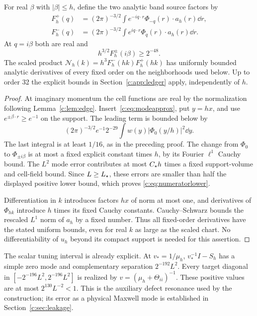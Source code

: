 \begin{lemma}
\label{c:lem:numerator}
For real $\beta$ with $|\beta|\le h$, define the two analytic band
source factors by
\begin{align*}
 F_h^+(q)&=(2\pi)^{-3/2}\int e^{-iq\cdot r}
             \Phi_{-q}(r)\cdot a_h(r)\dd r,\\
 F_h^-(q)&=(2\pi)^{-3/2}\int e^{iq\cdot r}
             \Phi_q(r)\cdot a_h(r)\dd r.
\end{align*}
At $q=i\beta$ both are real and
\begin{equation}
 h^{3/2}F_h^\pm(i\beta)\ge2^{-48}.                   \label{c:eq:numeratorlower}
\end{equation}
The scaled product
$\mathcal N_h(k)=h^3F_h^-(hk)F_h^+(hk)$ has uniformly bounded
analytic derivatives of every fixed order on the neighborhoods used
below. Up to order 32 the explicit bounds in
Section~\ref{c:app:ledger} apply, independently of $h$.
\end{lemma}
\begin{proof}
At imaginary momentum the cell functions are real by the normalization
following Lemma~\ref{c:lem:edge}. Insert~\eqref{c:eq:modeapprox}, put
$y=hx$, and use $e^{\pm\beta\cdot r}\ge e^{-1}$ on the support.
The leading term is bounded below by
\[
 (2\pi)^{-3/2}e^{-1}2^{-29}
 \int w(y)|\Phi_0(y/h)|^2\dd y.
\]
The last integral is at least $1/16$, as in the preceding proof.
The change from $\Phi_0$ to $\Phi_{\pm i\beta}$ is at most a fixed
explicit constant times $h$, by its Fourier $\ell^1$ Cauchy bound.
The $L^2$ mode error contributes at most $C_\star h$ times a fixed
support-volume and cell-field bound. Since $L\ge L_\star$, these errors
are smaller than half the displayed positive lower bound, which proves
\eqref{c:eq:numeratorlower}.

Differentiation in $k$ introduces factors $hx$ of norm at most one,
and derivatives of $\Phi_{hk}$ introduce $h$ times its fixed Cauchy
constants. Cauchy--Schwarz bounds the rescaled $L^1$ norm of $a_h$ by a
fixed number. Thus all fixed-order derivatives have the stated uniform
bounds, even for real $k$ as large as the scaled chart. No differentiability
of $u_h$ beyond its compact support is needed for this assertion.
\end{proof}

The scalar tuning interval is already explicit. At $v_* =1/\mu_h$,
$v_*^{-1}I-S_h$ has a simple zero mode and complementary separation
$2^{-192}L^2$. Every target diagonal in
$[-2^{-196}L^2,2^{-196}L^2]$ is realized by
$v=(\mu_h+\Theta_{ii})^{-1}$. These positive values are at most
$2^{130}L^{-2}<1$. This is the auxiliary defect resonance used by the
construction; its error as a physical Maxwell mode is established in
Section~\ref{c:sec:leakage}.

